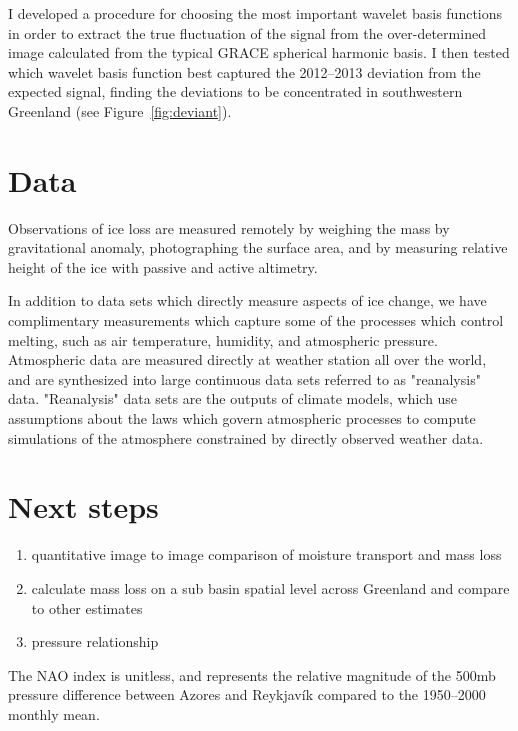 \documentclass[11pt]{report}
\begin{document}
I developed a procedure for choosing the most important wavelet basis functions in order to extract the true fluctuation of the signal from the over-determined image calculated from the typical GRACE spherical harmonic basis. I then tested which wavelet basis function best captured the 2012--2013 deviation from the expected signal, finding the deviations to be concentrated in southwestern Greenland (see
Figure~\ref{fig:deviant}). 



\section{Data}

Observations of ice loss are measured remotely by weighing the mass by gravitational anomaly, photographing the surface area, and by measuring relative height of the ice with passive and active altimetry.

In addition to data sets which directly measure aspects of ice change, we have complimentary measurements which capture some of the processes which control melting, such as air temperature, humidity, and atmospheric pressure. Atmospheric data are measured directly at weather station all over the world, and are synthesized into large continuous data sets referred to as "reanalysis" data. "Reanalysis" data sets are the outputs of climate models, which use assumptions about the laws which govern atmospheric processes to compute simulations of the atmosphere constrained by directly observed weather data.



\section{Next steps}

\begin{enumerate}
\item quantitative image to image comparison of moisture transport and mass loss
\item calculate mass loss on a sub basin spatial level across Greenland and compare to other estimates
\item pressure relationship
\end{enumerate}

The NAO index is unitless, and represents the relative magnitude of the 500mb pressure difference between Azores and Reykjav\'ik compared to the 1950--2000 monthly mean.





\small
\renewcommand{\bibsep}{0em}

\renewcommand{\bibname}{References}


\end{document}
